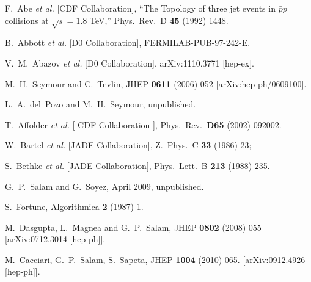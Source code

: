 \documentclass[12pt,a4]{article}
\begin{document}
\begin{thebibliography}{99}
  F.~Abe {\it et al.}  [CDF Collaboration],
  ``The Topology of three jet events in $\bar{p}p$ collisions at $\sqrt{s} =
  1.8$ TeV,''
  Phys.\ Rev.\ D {\bf 45} (1992) 1448.

  B.~Abbott {\it et al.} [D0 Collaboration],
  FERMILAB-PUB-97-242-E.

  V.~M.~Abazov {\it et al.} [D0 Collaboration],
  arXiv:1110.3771 [hep-ex].

  M.~H.~Seymour and C.~Tevlin,
  JHEP {\bf 0611} (2006) 052
  [arXiv:hep-ph/0609100].

 L.~A.~del~Pozo and M.~H.~Seymour, unpublished.

  T.~Affolder {\it et al.} [ CDF Collaboration ],
  Phys.\ Rev.\  {\bf D65 } (2002)  092002.

  W.~Bartel {\it et al.}  [JADE Collaboration],
  Z.\ Phys.\ C {\bf 33} (1986) 23; 

  S.~Bethke {\it et al.}  [JADE Collaboration],
  Phys.\ Lett.\ B {\bf 213} (1988) 235.

 G.~P.~Salam and G.~Soyez, April 2009,
  unpublished. 

  S.~Fortune,
  Algorithmica {\bf 2} (1987) 1.

  M.~Dasgupta, L.~Magnea and G.~P.~Salam,
  JHEP {\bf 0802} (2008) 055
  [arXiv:0712.3014 [hep-ph]].

  M.~Cacciari, G.~P.~Salam, S.~Sapeta,
  JHEP {\bf 1004 } (2010)  065.
  [arXiv:0912.4926 [hep-ph]].


\end{thebibliography}
\end{document}
